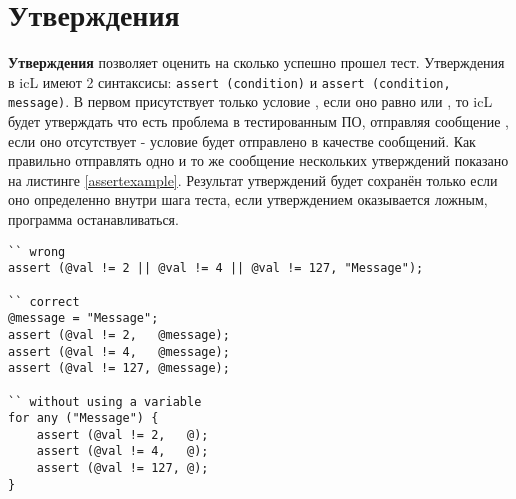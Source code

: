 \section{Утверждения}

{\bf Утверждения} позволяет оценить на сколько успешно прошел тест. Утверждения в icL имеют 2 синтаксисы: \lstinline|assert (condition)| и \lstinline|assert (condition, message)|. В первом присутствует только условие , если оно равно \false{} или \void, то icL будет утверждать что есть проблема в тестированным ПО, отправляя сообщение , если оно отсутствует - условие будет отправлено в качестве сообщений. Как правильно отправлять одно и то же сообщение нескольких утверждений показано на листинге \ref{assertexample}. Результат утверждений будет сохранён только если оно определенно внутри шага теста, если утверждением оказывается ложным, программа останавливаться.

\begin{lstlisting}[caption=Пример использования утверждениях, label=assertexample]
`` wrong
assert (@val != 2 || @val != 4 || @val != 127, "Message");

`` correct
@message = "Message";
assert (@val != 2,   @message);
assert (@val != 4,   @message);
assert (@val != 127, @message);

`` without using a variable
for any ("Message") {
	assert (@val != 2,   @);
	assert (@val != 4,   @);
	assert (@val != 127, @);
}
\end{lstlisting}


